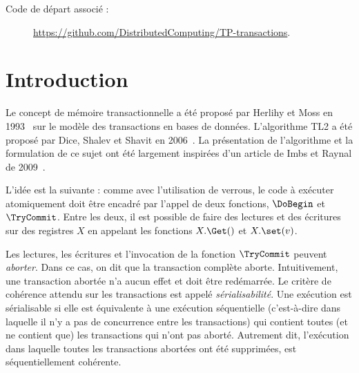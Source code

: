 
\begingroup

\begin{description}
\item[Code de départ associé :] \url{https://github.com/DistributedComputing/TP-transactions}.
\end{description}




\section{Introduction}
Le concept de mémoire transactionnelle a été proposé par Herlihy et Moss en 1993~\cite{HM} sur le modèle des transactions en bases de données.
L'algorithme TL2 a été proposé par Dice, Shalev et Shavit en 2006~\cite{DSS}. La présentation de l'algorithme et la formulation de ce sujet ont été largement inspirées
d'un article de Imbs et Raynal de 2009~\cite{IR}. 

L'idée est la suivante : comme avec l'utilisation de verrous, le code à exécuter atomiquement
doit être encadré par l'appel de deux fonctions, $\DoBegin$ et $\TryCommit$.
Entre les deux, il est possible de faire des lectures et des écritures sur des registres $X$
en appelant les fonctions $X.\Get()$ et $X.\set(v)$.

Les lectures, les écritures et l'invocation de la fonction $\TryCommit$ peuvent \emph{aborter}. Dans ce cas, on dit
que la transaction complète aborte. Intuitivement, une transaction abortée n'a aucun effet et doit être redémarrée.
Le critère de cohérence attendu sur les transactions est appelé
\emph{sérialisabilité}.
Une exécution est sérialisable si elle est équivalente à une exécution séquentielle
(c'est-à-dire dans laquelle il n'y a pas de concurrence entre les transactions)
qui contient toutes (et ne contient que) les transactions qui n'ont pas aborté.
Autrement dit, l'exécution dans laquelle toutes les transactions abortées ont été supprimées,
est séquentiellement cohérente. 

